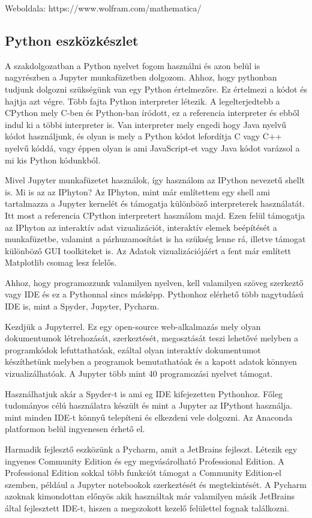 Weboldala: https://www.wolfram.com/mathematica/

    \subsection{Python eszközkészlet}\label{python-eszkuxf6zkuxe9szlet}

    A szakdolgozatban a Python nyelvet fogom használni és azon belül is
nagyrészben a Jupyter munkafüzetben dolgozom. Ahhoz, hogy pythonban
tudjunk dolgozni szükségünk van egy Python értelmezőre. Ez értelmezi a
kódot és hajtja azt végre. Több fajta Python interpreter létezik. A
legelterjedtebb a CPython mely C-ben és Python-ban íródott, ez a
referencia interpreter és ebből indul ki a többi interpreter is. Van
interpreter mely engedi hogy Java nyelvű kódot használjunk, és olyan is
mely a Python kódot lefordítja C vagy C++ nyelvű kóddá, vagy éppen olyan
is ami JavaScript-et vagy Java kódot varázsol a mi kis Python kódunkból.

Mivel Jupyter munkafüzetet használok, így használom az IPython nevezetű
shellt is. Mi is az az IPhyton? Az IPhyton, mint már említettem egy
shell ami tartalmazza a Jupyter kernelét és támogatja különböző
interpreterek használatát. Itt most a referencia CPython interpretert
használom majd. Ezen felül támogatja az IPhyton az interaktív adat
vizualizációt, interaktív elemek beépítését a munkafüzetbe, valamint a
párhuzamosítást is ha szükség lenne rá, illetve támogat különböző GUI
toolkiteket is. Az Adatok vizualizációjáért a fent már említett
Matplotlib csomag lesz felelős.

Ahhoz, hogy programozzunk valamilyen nyelven, kell valamilyen szöveg
szerkeztő vagy IDE és ez a Pythonnal sincs másképp. Pythonhoz elérhető
több nagytudású IDE is, mint a Spyder, Jupyter, Pycharm.

Kezdjük a Jupyterrel. Ez egy open-source web-alkalmazás mely olyan
dokumentumok létrehozását, szerkeztését, megosztását teszi lehetővé
melyben a programkódok lefuttathatóak, ezáltal olyan interaktív
dokumentumot készíthetünk melyben a programok bemutathatóak és a kapott
adatok könnyen vizualizálhatóak. A Jupyter több mint 40 programozási
nyelvet támogat.

Használhatjuk akár a Spyder-t is ami eg IDE kifejezetten Pythonhoz.
Főleg tudományos célú használatra készült és mint a Jupyter az IPythont
használja. mint minden IDE-t könnyű telepíteni és elkezdeni vele
dolgozni. Az Anaconda platformon belül ingyenesen érhető el.

Harmadik fejlesztő eszközünk a Pycharm, amit a JetBrains fejleszt.
Létezik egy ingyenes Community Edition és egy megvásárolható
Professional Edition. A Professional Edition sokkal több funkciót
támogat a Community Edition-el szemben, például a Jupyter notebookok
szerkeztését és megtekintését. A Pycharm azoknak kimondottan előnyös
akik használtak már valamilyen másik JetBrains által fejlesztett IDE-t,
hiszen a megszokott kezelő felülettel fognak találkozni.
